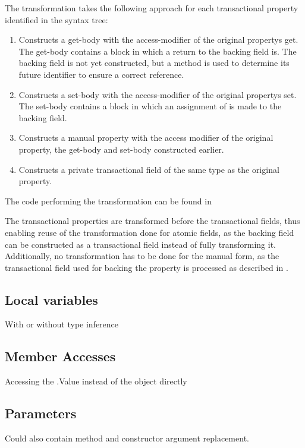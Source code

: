 The transformation takes the following approach for each transactional property identified in the syntax tree:

\begin{enumerate}
	\item Constructs a get-body with the access-modifier of the original propertys get. The get-body contains a block in which a return to the backing field is. The backing field is not yet constructed, but a method is used to determine its future identifier to ensure a correct reference.
	\item Constructs a set-body with the access-modifier of the original propertys set. The set-body contains a block in which an assignment of  is made to the backing field.
	\item Constructs a manual property with the access modifier of the original property, the get-body and set-body constructed earlier.
	\item Constructs a private transactional field of the same type as the original property.
\end{enumerate}
The code performing the transformation can be found in 

The transactional properties are transformed before the transactional fields, thus enabling reuse of the transformation done for atomic fields, as the backing field can be constructed as a transactional field instead of fully transforming it. Additionally, no transformation has to be done for the manual form, as the transactional field used for backing the property is processed as described in . 


\subsection{Local variables}
With or without type inference

\subsection{Member Accesses}
Accessing the .Value instead of the object directly

\subsection{Parameters}
Could also contain method and constructor argument replacement.

